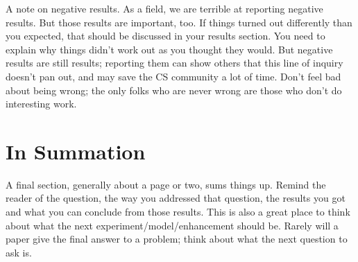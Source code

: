 \documentclass[12pt] {article}
\begin{document}
A note on negative results. As a field, we are terrible at reporting negative results. But those results are important, too. If things turned out differently than you expected, that should be discussed in your results section. You need to explain why things didn’t work out as you thought they would. But negative results are still results; reporting them can show others that this line of inquiry doesn’t pan out, and may save the CS community a lot of time. Don’t feel bad about being wrong; the only folks who are never wrong are those who don’t do interesting work. 

\section{In Summation}
A final section, generally about a page or two, sums things up. Remind the reader of the question, the way you addressed that question, the results you got and what you can conclude from those results. This is also a great place to think about what the next experiment/model/enhancement should be. Rarely will a paper give the final answer to a problem; think about what the next question to ask is. 


\pagebreak
\end{document}
